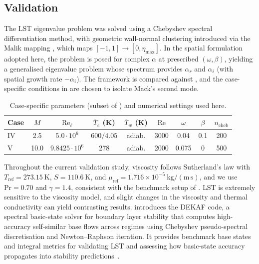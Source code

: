 \subsection{Validation}

The \gls{LST} eigenvalue problem was solved using a Chebyshev spectral differentiation method, with geometric wall-normal clustering introduced via the Malik mapping \citep{Malik1990a}, which maps $[-1,1]\to[0,\eta_{\max}]$. In the spatial formulation adopted here, the problem is posed for complex $\alpha$ at prescribed $(\omega,\beta)$, yielding a generalised eigenvalue problem whose spectrum provides $\alpha_r$ and $\alpha_i$ (with spatial growth rate $-\alpha_i$). The framework is compared against \citet{Groot2018}, and the case-specific conditions in  are chosen to isolate Mack's second mode.

\begin{table}[ht]
  \centering
  \caption{Case-specific parameters (subset of \citet{Groot2018}) and numerical settings used here.}
  \label{table:lstcomp}
  \vspace{0.25em}
  \begin{tabular}{@{}lcccccccc@{}}
    \toprule
    Case & $M$  & $\mathrm{Re}_\ell$ &
    $\overline{T}_e$ (K) & $\overline{T}_w$ (K) & $\mathrm{Re}$ &
    $\omega$ & $\beta$ & $n_{\mathrm{cheb}}$ \\
    \midrule
    IV & 2.5   & $5.0\cdot10^{6}$ & $600/4.05$ & adiab. & 3000 & 0.04  & 0.1 & 200 \\
    V  & 10.0  & $9.8425\cdot10^{6}$ & 278       & adiab. & 2000 & 0.075 & 0   & 500 \\
    \bottomrule
  \end{tabular}
\end{table}

Throughout the current validation study, viscosity follows Sutherland's law with $T_{\mathrm{ref}}=273.15\ \mathrm{K}$, $S=110.6\ \mathrm{K}$, and $\mu_{\mathrm{ref}}=1.716\times10^{-5}\ \mathrm{kg/(m\,s)}$, and we use $\mathrm{Pr}=0.70$ and $\gamma=1.4$, consistent with the benchmark setup of \citet{Groot2018}. \gls{LST} is extremely sensitive to the viscosity model, and slight changes in the viscosity and thermal conductivity can yield contrasting results. \cite{Groot2018} introduces the DEKAF code, a spectral basic-state solver for boundary layer stability that computes high-accuracy self-similar base flows across regimes using Chebyshev pseudo-spectral discretisation and Newton--Raphson iteration. It provides benchmark base states and integral metrics for validating \gls{LST} and assessing how basic-state accuracy propagates into stability predictions~\citep{MiroMiro2019}.

